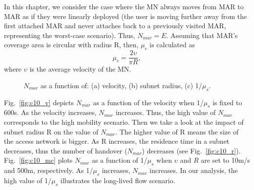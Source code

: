 In this chapter, we consider the case where the MN always moves from MAR to MAR as if they were linearly deployed (the user is moving further away from the first attached MAR and never attaches back to a previously visited MAR, representing the worst-case scenario). Thus, $N_{mar} =  E$. Assuming that MAR's coverage area is circular with radius R, then, $\mu_{c}$ is calculated as \cite{HO_comparison_Makaya} \\
\begin{equation}
\mu_{c}=\frac{2 \upsilon}{\pi R},
\end{equation}
where $\upsilon$ is the average velocity of the MN.

\begin{figure}[h!]
\centering
{}
\caption[Expected number of handovers.]{$N_{mar}$ as a function of: (a) velocity, (b) subnet radius, (c) 1/$\mu_{s}$.}
\label{fig:c10_n_mar}
\end{figure}

Fig.~\ref{fig:c10_v} depicts $N_{mar}$ as a function of the velocity when 1/$\mu_{s} $ is fixed to 600s. As the velocity increases, $N_{mar}$ increases. Thus, the high value of $N_{mar}$ corresponds to the high mobility scenario. Then we take a look at the impact of subnet radius R on the value of $N_{mar}$. The higher value of R means the size of the access network is bigger. As R increases, the residence time in a subnet decreases, thus the  number of handover ($N_{mar}$) decreases (see Fig.~\ref{fig:c10_r}). Fig.~\ref{fig:c10_mc} plots $N_{mar}$ as a function of 1/$\mu_{s}$ when $\upsilon$ and $R$ are set to 10m/s and 500m, respectively. As 1/$\mu_{s}$  increases, $N_{mar}$ increases. In our analysis, the high value of 1/$\mu_{s}$ illustrates the long-lived flow scenario. 

